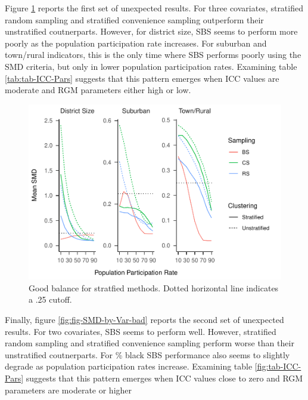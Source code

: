 \documentclass[man,floatsintext]{apa6}
\begin{document}
Figure \ref{fig:fig-SMD-by-Var-good2} reports the first set of unexpected results. For three covariates, stratified random sampling and stratified convenience sampling outperform their unstratified coutnerparts. However, for district size, SBS seems to perform more poorly as the population participation rate increases. For suburban and town/rural indicators, this is the only time where SBS performs poorly using the SMD criteria, but only in lower population participation rates. Examining table \ref{tab:tab-ICC-Pars} suggests that this pattern emerges when ICC values are moderate and RGM parameters either high or low.



\begin{figure}
\centering
\includegraphics{GenSamp-Paper_files/figure-latex/fig-SMD-by-Var-good2-1.pdf}
\caption{\label{fig:fig-SMD-by-Var-good2}Good balance for stratfied methods. Dotted horizontal line indicates a .25 cutoff.}
\end{figure}

Finally, figure \ref{fig:fig-SMD-by-Var-bad} reports the second set of unexpected results. For two covariates, SBS seems to perform well. However, stratified random sampling and stratified convenience sampling perform worse than their unstratified coutnerparts. For \% black SBS performance also seems to slightly degrade as population participation rates increase. Examining table \ref{fig:tab-ICC-Pars} suggests that this pattern emerges when ICC values close to zero and RGM parameters are moderate or higher
\end{document}
